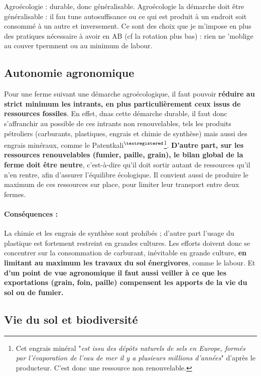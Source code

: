 \documentclass{book}
\begin{document}
Agroécologie : durable, donc généralisable.
Agroécologie la démarche doit être généralisable : il fau tune autosuffisance ou ce qui est produit à un endroit soit consommé à un autre et inversement.
Ce sont des choix que je m'impose en plus des pratiques nécessaire à avoir en AB (cf la rotation plus bas) : rien ne 'moblige au couver tpermnent ou au minimum de labour.

\subsection{Autonomie agronomique}

Pour une ferme suivant une démarche agroécologique, il faut pouvoir \textbf{réduire au strict minimum les intrants, en plus particulièrement ceux issus de ressources fossiles}. En effet, dnas cette démarche durable, il faut donc s'affranchir au possible de ces intrants non renouvelables, tels les produits pétroliers (carburants, plastiques, engrais et chimie de synthèse) mais aussi des engrais minéraux, comme le Patentkali$^\mathrm{\textregistered}$\footnote{Cet engrais minéral "\textit{est issu des dépôts naturels de sels en Europe, formés par l’évaporation de l’eau de mer il y a plusieurs millions d’années}" d'après le producteur. C'est donc une ressource non renouvelable.}. \textbf{D'autre part, sur les ressources renouvelables (fumier, paille, grain), le bilan global de la ferme doit être neutre}, c'est-à-dire qu'il doit sortir autant de ressources qu'il n'en rentre, afin d'assurer l'équilibre écologique. Il convient aussi de produire le maximum de ces ressources sur place, pour limiter leur transport entre deux fermes.

\paragraph{Conséquences :} La chimie et les engrais de synthèse sont prohibés ; d'autre part l'usage du plastique est fortement restreint en grandes cultures. Les efforts doivent donc se concentrer sur la consommation de carburant, inévitable en grande culture, \textbf{en limitant au maximum les travaux du sol énergivores}, comme le labour. Et \textbf{d'un point de vue agronomique il faut aussi veiller à ce que les exportations (grain, foin, paille) compensent les apports de la vie du sol ou de fumier.}

\subsection{Vie du sol et biodiversité}
\end{document}
